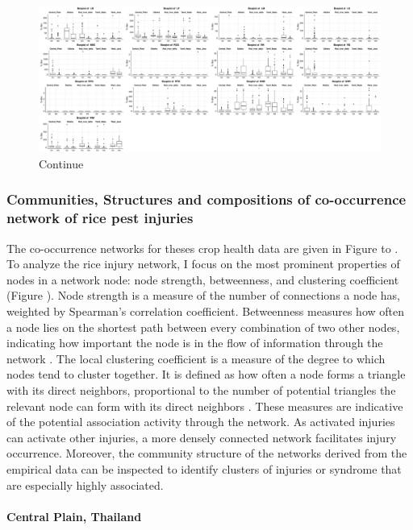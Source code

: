 \begin{landscape}
\begin{figure}[!h]
\centering
\includegraphics[height = 1\textheight]{figures/boxplot2/boxplot2.pdf}
\caption{Continue}
\label{fig:boxplot2}
\end{figure}
\end{landscape} \subsubsection{Communities, Structures and compositions of co-occurrence network of rice pest injuries}
The co-occurrence networks for theses crop health data are given in Figure to . To analyze the rice injury network, I focus on the most prominent properties of nodes in a network node: node strength, betweenness, and clustering coefficient (Figure ). Node strength is a measure of the number of connections a node has, weighted by Spearman’s correlation coefficient. Betweenness measures how often a node lies on the shortest path between every combination of two other nodes, indicating how important the node is in the flow of information through the network \citep{Opsahl_2010_Node}. The local clustering coefficient is a measure of the degree to which nodes tend to cluster together. It is defined as how often a node forms a triangle with its direct neighbors, proportional to the number of potential triangles the relevant node can form with its direct neighbors \citet{Opsahl_2010_Node}. These measures are indicative of the potential association activity through the network. As activated injuries can activate other injuries, a more densely connected network facilitates injury occurrence. Moreover, the community structure of the networks derived from the empirical data can be inspected to identify clusters of injuries or syndrome that are especially highly associated.


\paragraph{Central Plain, Thailand}

